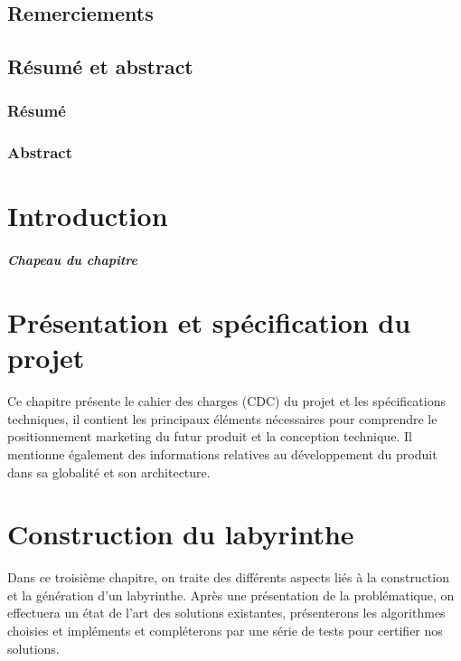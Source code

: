 \documentclass[12pt, french]{report}
\begin{document}

\clearpage

\thispagestyle{empty}
\section*{Remerciements}

\clearpage
\thispagestyle{empty}
\section*{Résumé et abstract}
\subsection*{Résumé}

\subsection*{Abstract}

\clearpage
\setcounter{page}{1}
\tableofcontents
\listoffigures

\clearpage

\chapter{Introduction}
\paragraph{Chapeau du chapitre}

\clearpage

\chapter{Présentation et spécification du projet}
Ce chapitre présente le cahier des charges (CDC) du projet et les
spécifications techniques, il contient les principaux éléments nécessaires
pour comprendre le positionnement marketing du futur produit et la
conception technique. Il mentionne également des informations relatives au
développement du produit dans sa globalité et son architecture.


\clearpage

\chapter{Construction du labyrinthe}
Dans ce troisième chapitre, on traite des différents aspects liés à la construction et la génération d'un labyrinthe.
Après une présentation de la problématique, on effectuera un état de l'art des solutions existantes, présenterons les algorithmes choisies et impléments et compléterons par une série de tests pour certifier nos solutions.

\clearpage
\end{document}
